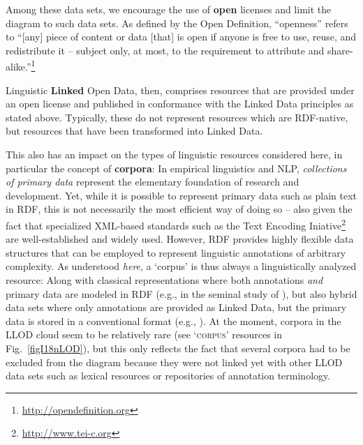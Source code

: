 Among these data sets, we encourage the use of \textbf{open} licenses and limit the diagram to such data sets. As defined by the Open Definition, ``openness'' refers to ``[any] piece of content or data [that] is open if anyone is free to use, reuse, and redistribute it -- subject only, at most, to the requirement to attribute and share-alike.''\footnote{\url{http://opendefinition.org}}

Linguistic \textbf{Linked} Open Data, then, comprises resources that are provided under an open license and published in conformance with the Linked Data principles as stated above.
Typically, these do not represent resources which are RDF-native, but resources that have been transformed into Linked Data. 

This also has an impact on the types of linguistic resources considered here, in particular the concept of \textbf{corpora}:
In empirical linguistics and NLP, \emph{collections of primary data} represent the elementary foundation of research and development. 
Yet, while it is possible to represent primary data such as plain text in RDF, this is not necessarily the most efficient way of doing so -- also given the fact that specialized XML-based standards such as the Text Encoding Iniative\footnote{
	\url{http://www.tei-c.org}
}
are well-established and widely used.
However, RDF provides highly flexible data structures that can be employed to represent linguistic annotations of arbitrary complexity. 
As understood \emph{here}, a `corpus' is thus always a linguistically analyzed resource:
Along with classical representations where both annotations \emph{and} primary data are modeled in RDF (e.g., in the seminal study of \citep{burchardt2008formalising}), 
but also hybrid data sets where only annotations are provided as Linked Data, but the primary data is stored in a conventional format (e.g., \citep{cassidy2010rdf}).
At the moment, corpora in the LLOD cloud seem to be relatively rare (see `\textsc{corpus}' resources in Fig.\ \ref{figI18nLOD}), 
but this only reflects the fact that several corpora had to be excluded from the diagram because they were not linked yet with other LLOD data sets such as lexical resources or repositories of annotation terminology.

